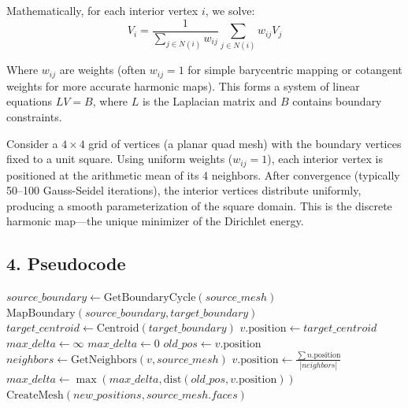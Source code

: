 Mathematically, for each interior vertex $i$, we solve:
$$V_i = \frac{1}{\sum_{j \in N(i)} w_{ij}} \sum_{j \in N(i)} w_{ij} V_j$$

Where $w_{ij}$ are weights (often $w_{ij} = 1$ for simple barycentric mapping or cotangent weights for more accurate harmonic maps). This forms a system of linear equations $L V = B$, where $L$ is the Laplacian matrix and $B$ contains boundary constraints.

\begin{example}\label{ex:harmonic_mapping}
Consider a $4 \times 4$ grid of vertices (a planar quad mesh) with the boundary vertices fixed to a unit square. Using uniform weights ($w_{ij} = 1$), each interior vertex is positioned at the arithmetic mean of its 4 neighbors. After convergence (typically 50--100 Gauss-Seidel iterations), the interior vertices distribute uniformly, producing a smooth parameterization of the square domain. This is the discrete harmonic map---the unique minimizer of the Dirichlet energy.
\end{example}

\subsection{4. Pseudocode}

\begin{algorithm}
\caption{Transfer Topology}
\label{alg:transfer_topology}
\begin{algorithmic}[1]
    \State $source\_boundary \gets \text{GetBoundaryCycle}(source\_mesh)$
    \State $\text{MapBoundary}(source\_boundary, target\_boundary)$ 
    \State $target\_centroid \gets \text{Centroid}(target\_boundary)$
        \State $v.\text{position} \gets target\_centroid$
    \EndFor
    \State $max\_delta \gets \infty$
        \State $max\_delta \gets 0$
            \State $old\_pos \gets v.\text{position}$
            \State $neighbors \gets \text{GetNeighbors}(v, source\_mesh)$
            \State $v.\text{position} \gets \frac{\sum n.\text{position}}{|neighbors|}$
            \State $max\_delta \gets \max(max\_delta, \text{dist}(old\_pos, v.\text{position}))$
        \EndFor
    \EndWhile
    \State \Return $\text{CreateMesh}(new\_positions, source\_mesh.faces)$
\EndFunction
\end{algorithmic}
\end{algorithm}

